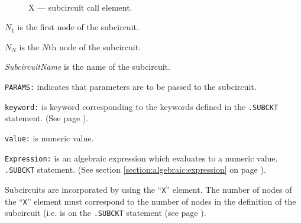 \begin{figure}[h]
\centering
\ 
\caption{X --- subcircuit call element.}
\end{figure}



\begin{widelist}
\item[$N_1$] is the first node of the subcircuit.
\item[$N_N$] is the $N$th node of the subcircuit.
\item[{\it SubcircuitName}] is the name of the subcircuit.
\item[{\tt PARAMS:}] indicates that parameters are to be passed to
the subcircuit.
\item[{\tt keyword:}] is keyword corresponding to the keywords defined in the
{\tt .SUBCKT} statement. (See page \pageref{.SUBCKTstatement}).
\item[{\tt value:}] is numeric value.
\item[{\tt Expression:}] is an algebraic expression which evaluates to a numeric
value.  {\tt .SUBCKT} statement. (See section \ref{section:algebraic:expression}
on page \pageref{section:algebraic:expression}).
\end{widelist}

Subcircuits are incorporated by using the ``{\tt X}'' element.
The number of nodes of the ``{\tt X}'' element must correspond to
the number of nodes in the definition of the subcircuit (i.e. is
on the {\tt .SUBCKT} statement (see page \pageref{.SUBCKTstatement}).

